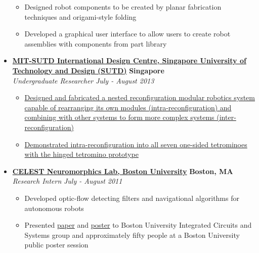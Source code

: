 \documentclass[10pt,letterpaper]{article}
\begin{document}
\begin{itemize}
	\begin{itemize}[label=\textbullet]
	\itemsep0em
	\item Designed robot components to be created by planar fabrication techniques and origami-style folding
	\item Developed a graphical user interface to allow users to create robot assemblies with components from part library

\end{itemize}

    \item[]
    {\href{http://www.sutd.edu.sg/idc.aspx}{\textbf{MIT-SUTD International Design Centre, Singapore University of Technology and Design (SUTD)}} \hfill
      \textbf{Singapore}}
    \\
    {\emph{Undergraduate Researcher} \hfill \emph{July - August 2013}}
	
	\begin{itemize}[label=\textbullet]
	\itemsep0em
	\item {\href{http://vincentkee.wordpress.com/tetromino/}{Designed and fabricated a nested reconfiguration modular robotics system capable of rearranging its own modules (intra-reconfiguration) and combining with other systems to form more complex systems (inter-reconfiguration)}}
	\item {\href{http://www.youtube.com/watch?v=YFhAlsQ3uYQ}{Demonstrated intra-reconfiguration into all seven one-sided tetrominoes with the hinged tetromino prototype}}

\end{itemize}


    \item[]
    {\href{http://nl.bu.edu/}{\textbf{CELEST Neuromorphics Lab, Boston University}} \hfill
      \textbf{Boston, MA}}
    \\
    {\emph{Research Intern} \hfill \emph{July - August 2011}}
	
	\begin{itemize}[label=\textbullet]
	\itemsep0em
	\item Developed optic-flow detecting filters and navigational algorithms for autonomous robots
	\item Presented \href{http://vincentkee.files.wordpress.com/2011/09/research-paper-the-final-draft.pdf}{paper} and \href{http://vincentkee.files.wordpress.com/2011/09/optic-flow-based-navigation-using-correlation-techniques.png}{poster} to Boston University Integrated Circuits and Systems group and approximately fifty people at a Boston University public poster session
	\end{itemize}
\end{itemize}
\end{document}
